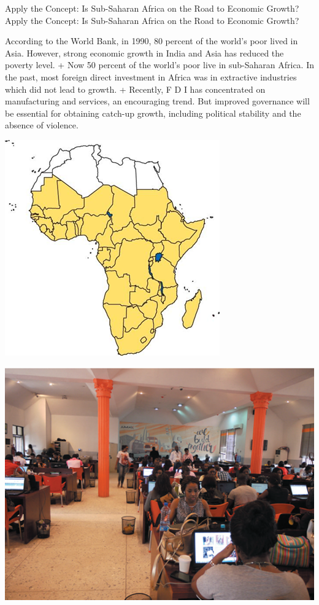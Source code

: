 \documentclass[
  12pt,
  ignorenonframetext,
]{beamer}
\begin{document}
\begin{frame}{Apply the Concept: Is Sub-Saharan Africa on the Road to
Economic Growth?}
\protect\hypertarget{apply-the-concept-is-sub-saharan-africa-on-the-road-to-economic-growth}{}
Apply the Concept: Is Sub-Saharan Africa on the Road to Economic Growth?

According to the World Bank, in 1990, 80 percent of the world's poor
lived in Asia. However, strong economic growth in India and Asia has
reduced the poverty level. + Now 50 percent of the world's poor live in
sub-Saharan Africa. In the past, most foreign direct investment in
Africa was in extractive industries which did not lead to growth. +
Recently, F D I has concentrated on manufacturing and services, an
encouraging trend. But improved governance will be essential for
obtaining catch-up growth, including political stability and the absence
of violence.

\includegraphics[width=\textwidth,height=0.99\textheight]{imgs3/img_slide54a.png}

\includegraphics[width=\textwidth,height=0.99\textheight]{imgs3/img_slide54b.png}
\end{frame}
\end{document}
